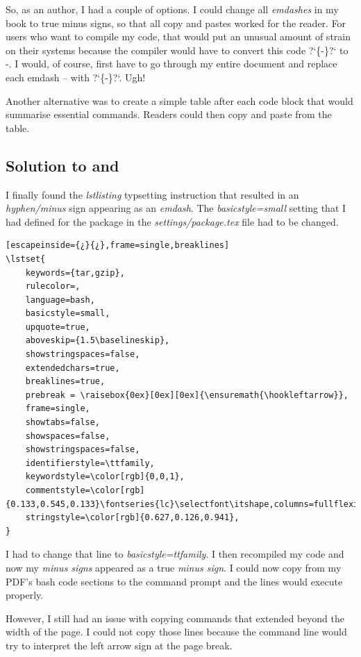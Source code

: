 So, as an author, I had a couple of options. I could change all \emph{emdashes} in my book to true minus signs, so that all copy and pastes worked for the reader. For users who want to compile my \latex code, that would put an unusual amount of strain on their systems because the \latex compiler would have to convert this code {?`}{\{-}\}{?`} to {-}. I would, of course, first have to go through my entire document and replace each emdash -- with {?`}{\{-}\}{?`}. Ugh!

Another alternative was to create a simple table after each code block that would summarise essential commands. Readers could then copy and paste from the table.

\subsection{Solution to \latex {} and }

I finally found the \latex \emph{lstlisting} typsetting instruction that resulted in an \emph{hyphen/minus} sign appearing as an \emph{emdash}.  The \emph{basicstyle=small} setting that I had defined for the  package in the \textsl{settings/package.tex} file had to be changed.

\begin{lstlisting}[escapeinside={¿}{¿},frame=single,breaklines]
\lstset{
	keywords={tar,gzip},
	rulecolor=,
	language=bash,
	basicstyle=small,
	upquote=true,
	aboveskip={1.5\baselineskip},
	showstringspaces=false,
	extendedchars=true,
	breaklines=true,
	prebreak = \raisebox{0ex}[0ex][0ex]{\ensuremath{\hookleftarrow}},
	frame=single,
	showtabs=false,
	showspaces=false,
	showstringspaces=false,
	identifierstyle=\ttfamily,
	keywordstyle=\color[rgb]{0,0,1},
	commentstyle=\color[rgb]{0.133,0.545,0.133}\fontseries{lc}\selectfont\itshape,columns=fullflexible,
	stringstyle=\color[rgb]{0.627,0.126,0.941},
}
\end{lstlisting}

I had to change that line to \emph{basicstyle=ttfamily}. I then recompiled my \latex code and now my \emph{minus signs} appeared as a true \emph{minus sign}. I could now copy from my PDF's bash code sections to the command prompt and the lines would execute properly. 

However, I still had an issue with copying commands that extended beyond the width of the page. I could not copy those lines because the command line would try to interpret the left arrow sign at the page break.

